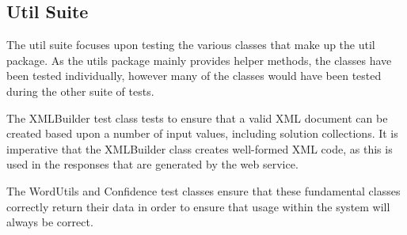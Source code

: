 \subsection{Util Suite}
\label{sub:test_util_suite}

The util suite focuses upon testing the various classes that make up the util 
package. As the utils package mainly provides helper methods, the classes have 
been tested individually, however many of the classes would have been tested 
during the other suite of tests.

The XMLBuilder test class tests to ensure that a valid XML document can be 
created based upon a number of input values, including solution collections. It
is imperative that the XMLBuilder class creates well-formed XML code, as this is
used in the responses that are generated by the web service.

The WordUtils and Confidence test classes ensure that these fundamental classes
correctly return their data in order to ensure that usage within the system will
always be correct.

